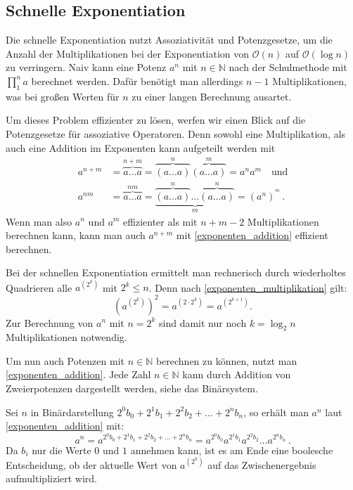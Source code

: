\documentclass[course=erap]{aspdoc}
\begin{document}
\subsection{Schnelle Exponentiation} \label{sec:schnelle_exp}
Die schnelle Exponentiation nutzt Assoziativität und Potenzgesetze, um die Anzahl der Multiplikationen bei der Exponentiation von $\mathcal{O}(n)$ auf $\mathcal{O}(\log{}n)$ zu verringern. 
Naiv kann eine Potenz $a^n$ mit $n\in\mathbb{N}$ nach der Schulmethode mit \(\prod_{1}^{n} a \) berechnet werden. 
Dafür benötigt man allerdings $n-1$ Multiplikationen, was bei großen Werten für $n$ zu einer langen Berechnung ausartet. \par
Um dieses Problem effizienter zu lösen, werfen wir einen Blick auf die Potenzgesetze für assoziative Operatoren. Denn sowohl eine Multiplikation, als auch eine Addition im Exponenten kann aufgeteilt werden mit
\begin{align}
  a^{n+m} &= \overbrace{a\dots a}^{n+m} = \overbrace{(a\dots a)}^n \overbrace{(a\dots a)}^m = a^n a^m \quad \text{und} \label{exponenten_addition} \\
  a^{nm} &= \overbrace{a\dots a}^{nm} = \underbrace{\overbrace{(a \dots a)}^n \dots \overbrace{(a \dots a)}^n}_m = (a^n)^{^m} \, . \label{exponenten_multiplikation}
\end{align}
Wenn man also $a^n$ und $a^m$ effizienter als mit $n+m-2$ Multiplikationen berechnen kann, kann man auch $a^{n+m}$ mit \ref{exponenten_addition} effizient berechnen.\par
Bei der schnellen Exponentiation ermittelt man rechnerisch durch wiederholtes Quadrieren alle $a^{(2^k)}$ mit $2^k \le n$. Denn nach \ref{exponenten_multiplikation} gilt:
\[ {\left( a^{(2^k)} \right)}^2 = a^{(2 \cdot 2^k)} = a^{(2^{k+1})}.\]
Zur Berechnung von $a^n$ mit $n=2^k$ sind damit nur noch $k=\log_2n$ Multiplikationen notwendig. \par
Um nun auch Potenzen mit $n\in\mathbb{N}$ berechnen zu können, nutzt man \ref{exponenten_addition}. 
Jede Zahl $n\in\mathbb{N}$ kann durch Addition von Zweierpotenzen dargestellt werden, siehe das Binärsystem. \par
Sei $n$ in Binärdarstellung $2^0b_0+2^1b_1+2^2b_2+\dots+2^nb_n$, so erhält man $a^n$ laut \ref{exponenten_addition} mit:
\[ a^n = a^{2^0b_0+2^1b_1+2^2b_2+\dots+2^nb_n} = a^{2^0b_0} a^{2^1b_1} a^{2^2b_2} \dots a^{2^nb_n} \, .\]
Da $b_i$ nur die Werte $0$ und $1$ annehmen kann, ist es am Ende eine boolesche Entscheidung, ob der aktuelle Wert von $a^{(2^k)}$ auf das Zwischenergebnis aufmultipliziert wird.\\
\end{document}
